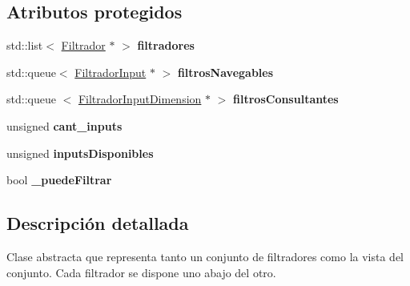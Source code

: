 \subsection*{\-Atributos protegidos}
\begin{DoxyCompactItemize}
\item 
\hypertarget{classFiltradores_aca46b72d23d8c16e708768340994eef6}{std\-::list$<$ \hyperlink{classFiltrador}{\-Filtrador} $\ast$ $>$ {\bfseries filtradores}}\label{classFiltradores_aca46b72d23d8c16e708768340994eef6}

\item 
\hypertarget{classFiltradores_ad8e0a2aecedd410cf8fc268a87f39135}{std\-::queue$<$ \hyperlink{classFiltradorInput}{\-Filtrador\-Input} $\ast$ $>$ {\bfseries filtros\-Navegables}}\label{classFiltradores_ad8e0a2aecedd410cf8fc268a87f39135}

\item 
\hypertarget{classFiltradores_aa97b49681afb1fa7a0a03d0ebb11db1f}{std\-::queue\*
$<$ \hyperlink{classFiltradorInputDimension}{\-Filtrador\-Input\-Dimension} $\ast$ $>$ {\bfseries filtros\-Consultantes}}\label{classFiltradores_aa97b49681afb1fa7a0a03d0ebb11db1f}

\item 
\hypertarget{classFiltradores_add3494980d7aafcf16e2c77cfd7bce10}{unsigned {\bfseries cant\-\_\-inputs}}\label{classFiltradores_add3494980d7aafcf16e2c77cfd7bce10}

\item 
\hypertarget{classFiltradores_a007d812879b019b9299465d02d848cfd}{unsigned {\bfseries inputs\-Disponibles}}\label{classFiltradores_a007d812879b019b9299465d02d848cfd}

\item 
\hypertarget{classFiltradores_a8d54b2ddb1d763c323c77ce53a1cacb6}{bool {\bfseries \-\_\-puede\-Filtrar}}\label{classFiltradores_a8d54b2ddb1d763c323c77ce53a1cacb6}

\end{DoxyCompactItemize}


\subsection{\-Descripción detallada}
\-Clase abstracta que representa tanto un conjunto de filtradores como la vista del conjunto. \-Cada filtrador se dispone uno abajo del otro. 

